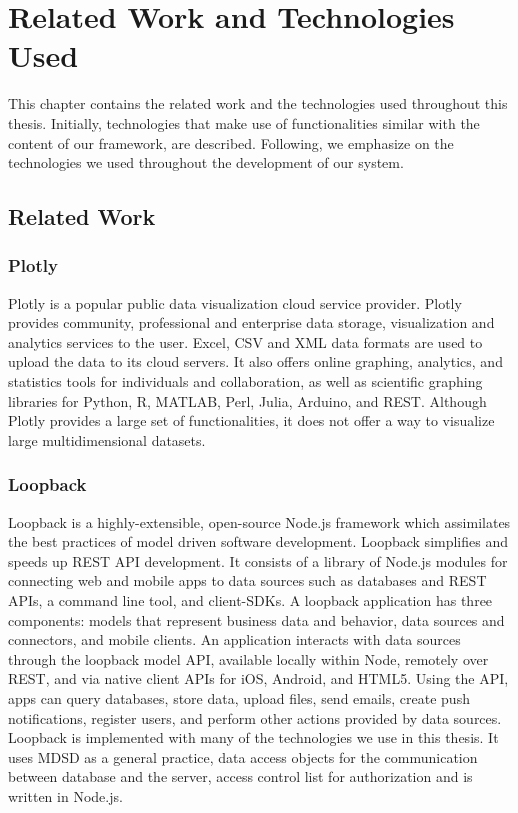
\chapter{Related Work and Technologies Used} %

\label{chapter3_rw}
This chapter contains the related work and the technologies used throughout this thesis. Initially, technologies that make use of functionalities similar with the content of our framework, are described. Following, we emphasize on the technologies we used throughout the development of our system.

\section{Related Work}

\subsection{Plotly}
Plotly is a popular public data visualization cloud service provider. Plotly provides community, professional and enterprise data storage, visualization and analytics services to the user.  Excel, CSV and XML data formats are used to upload the data to its cloud servers.  It also offers online graphing, analytics, and statistics tools for individuals and collaboration, as well as scientific graphing libraries for Python, R, MATLAB, Perl, Julia, Arduino, and REST. Although Plotly provides a large set of functionalities, it does not offer a way to visualize large multidimensional datasets.

\subsection{Loopback}
Loopback is a highly-extensible, open-source Node.js framework which assimilates the best practices of model driven software development. Loopback simplifies and speeds up REST API development. It consists of a library of Node.js modules for connecting web and mobile apps to data sources such as databases and REST APIs, a command line tool, and client-SDKs. A loopback application has three components: models that represent business data and behavior, data sources and connectors, and mobile clients. An application interacts with data sources through the loopback model API, available locally within Node, remotely over REST, and via native client APIs for iOS, Android, and HTML5. Using the API, apps can query databases, store data, upload files, send emails, create push notifications, register users, and perform other actions provided by data sources.
	Loopback is implemented with many of the technologies we use in this thesis. It uses MDSD as a general practice, data access objects for the communication between database and the server, access control list for  authorization and is written in Node.js.

